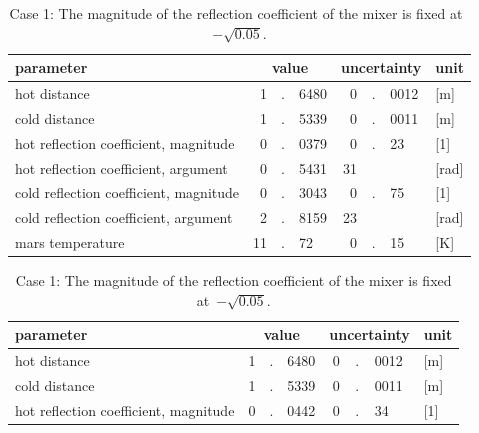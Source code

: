 \begin{refsection}
\begin{table}
    \centering
    \begin{tabular}{l r@{}c@{}l r@{}c@{}l l}
        \toprule
        parameter &
        \multicolumn{3}{c}{value} &
        \multicolumn{3}{c}{uncertainty} & unit\\
        \midrule
            hot distance                                 &  1&.&6480  &  0&.&0012 & [\si{\meter}]  \\
            cold distance                                &  1&.&5339  &  0&.&0011 & [\si{\meter}]  \\
            hot reflection coefficient, magnitude        &  0&.&0379  &  0&.&23   & [1]            \\
            hot reflection coefficient, argument         &  0&.&5431  & 31& &     & [\si{\radian}] \\
            cold reflection coefficient, magnitude       &  0&.&3043  &  0&.&75   & [1]            \\
            cold reflection coefficient, argument        &  2&.&8159  & 23& &     & [\si{\radian}] \\
            mars temperature                             & 11&.&72    &  0&.&15   & [\si{\kelvin}] \\
        \bottomrule
    \end{tabular}
    \caption*{Case 1: The magnitude of the reflection coefficient of the mixer is fixed at~$-\sqrt{0.05}$.}
    \bigskip
    \begin{tabular}{l r@{}c@{}l r@{}c@{}l l}
        \toprule
        parameter &
        \multicolumn{3}{c}{value} &
        \multicolumn{3}{c}{uncertainty} & unit\\
        \midrule
            hot distance                                 &  1&.&6480 &  0&.&0012 & [\si{\meter}]  \\
            cold distance                                &  1&.&5339 &  0&.&0011 & [\si{\meter}]  \\
            hot reflection coefficient, magnitude        &  0&.&0442 &  0&.&34   & [1]            \\

\end{tabular}
\end{table}
\end{refsection}
